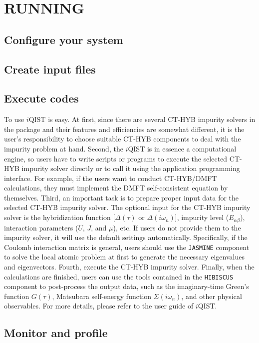 \chapter{RUNNING}
\section{Configure your system}
\section{Create input files}
\section{Execute codes}

To use $i$QIST is easy. At first, since there are several CT-HYB impurity solvers in the package and their features and efficiencies are somewhat different, it is the user's responsibility to choose suitable CT-HYB components to deal with the impurity problem at hand. Second, the $i$QIST is in essence a computational engine, so users have to write scripts or programs to execute the selected CT-HYB impurity solver directly or to call it using the application programming interface. For example, if the users want to conduct CT-HYB/DMFT calculations, they must implement the DMFT self-consistent equation by themselves. Third, an important task is to prepare proper input data for the selected CT-HYB impurity solver. The optional input for the CT-HYB impurity solver is the hybridization function [$\Delta(\tau)$ or $\Delta(i\omega_n)$], impurity level ($E_{\alpha\beta}$), interaction parameters ($U$, $J$, and $\mu$), etc. If users do not provide them to the impurity solver, it will use the default settings automatically. Specifically, if the Coulomb interaction matrix is general, users should use the \texttt{JASMINE} component to solve the local atomic problem at first to generate the necessary eigenvalues and eigenvectors. Fourth, execute the CT-HYB impurity solver. Finally, when the calculations are finished, users can use the tools contained in the \texttt{HIBISCUS} component to post-process the output data, such as the imaginary-time Green's function $G(\tau)$, Matsubara self-energy function $\Sigma(i\omega_n)$, and other physical observables. For more details, please refer to the user guide of $i$QIST.

\section{Monitor and profile}
